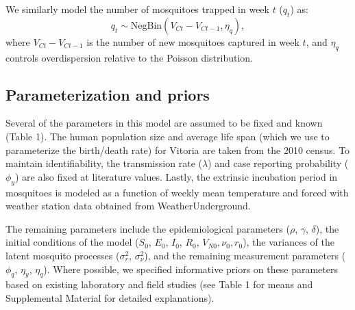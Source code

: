 \documentclass[10pt,letterpaper]{article}
\begin{document}
We similarly model the number of mosquitoes trapped in week $t$ ($q_t$) as:
\begin{equation}
q_t \sim \text{NegBin}(V_{Ct} - V_{Ct-1}, \eta_q),
\end{equation}
where $V_{Ct} - V_{Ct-1}$ is the number of new mosquitoes captured in week $t$, and $\eta_q$ controls overdispersion relative to the Poisson distribution.

\subsection*{Parameterization and priors}

Several of the parameters in this model are assumed to be fixed and known (Table 1).
The human population size and average life span (which we use to parameterize the birth/death rate) for Vitoria are taken from the 2010 census.
To maintain identifiability, the transmission rate ($\lambda$) and case reporting probability ($\phi_y$) are also fixed at literature values.
Lastly, the extrinsic incubation period in mosquitoes is modeled as a function of weekly mean temperature and forced with weather station data obtained from WeatherUnderground.

The remaining parameters include the epidemiological parameters ($\rho$, $\gamma$, $\delta$), the initial conditions of the model ($S_0$, $E_0$, $I_0$, $R_0$, $V_{N0}, \nu_0, r_0$), the variances of the latent mosquito processes ($\sigma^2_r$, $\sigma^2_{\nu}$), and the remaining measurement parameters ($\phi_q$, $\eta_y$, $\eta_q$).  
Where possible, we specified informative priors on these parameters based on existing laboratory and field studies (see Table 1 for means and Supplemental Material for detailed explanations).
\end{document}
